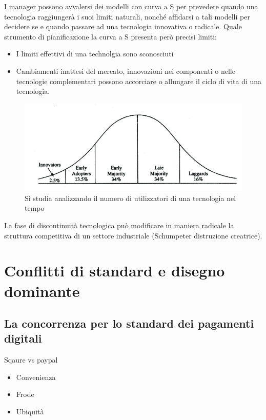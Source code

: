 \documentclass{article}
\begin{document}
I manager possono avvalersi dei modelli con curva a S per prevedere quando una tecnologia
raggiungerà i suoi limiti naturali, nonché affidarsi a tali modelli per decidere se e quando passare
ad una tecnologia innovativa o radicale.
Quale strumento di pianificazione la curva a S presenta però precisi limiti:
\begin{itemize}
	\item I limiti effettivi di una technolgia sono sconosciuti
	\item Cambiamenti inattesi del mercato, innovazioni nei componenti o nelle tecnologie
	complementari possono accorciare o allungare il ciclo di vita di una tecnologia.
\end{itemize}

\begin{figure}[h!]
	\centering
	\includegraphics[scale=0.3]{images/adopters.png}
	\caption{Si studia analizzando il numero di utilizzatori di una tecnologia nel tempo}
	\label{fig:adopters}
\end{figure}

La fase di discontinuità tecnologica può modificare in maniera radicale la struttura competitiva di un settore industriale (Schumpeter distruzione creatrice).

\section{Conflitti di standard e disegno dominante}
\subsection{La concorrenza per lo standard dei pagamenti digitali}

Sqaure vs paypal
\begin{itemize}
	\item Convenienza
	\item Frode
	\item Ubiquità
\end{itemize}
\end{document}
